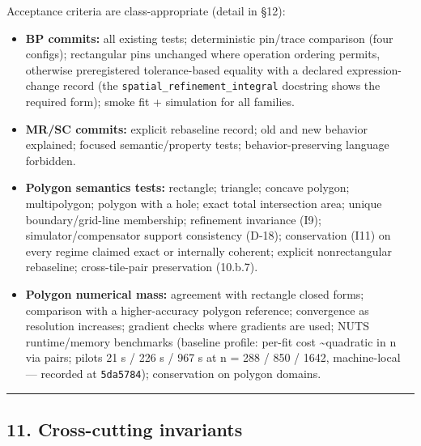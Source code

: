 \documentclass[
  10pt,
]{article}
\providecommand{\tightlist}{%
  \setlength{\itemsep}{0pt}\setlength{\parskip}{0pt}}
\begin{document}
Acceptance criteria are class-appropriate (detail in §12):

\begin{itemize}
\tightlist
\item
  \textbf{BP commits:} all existing tests; deterministic pin/trace comparison (four configs); rectangular pins unchanged where operation ordering permits, otherwise preregistered tolerance-based equality with a declared expression-change record (the \texttt{spatial\_\allowbreak{}refinement\_\allowbreak{}integral} docstring shows the required form); smoke fit + simulation for all families.
\item
  \textbf{MR/SC commits:} explicit rebaseline record; old and new behavior explained; focused semantic/property tests; behavior-preserving language forbidden.
\item
  \textbf{Polygon semantics tests:} rectangle; triangle; concave polygon; multipolygon; polygon with a hole; exact total intersection area; unique boundary/grid-line membership; refinement invariance (I9); simulator/compensator support consistency (D-18); conservation (I11) on every regime claimed exact or internally coherent; explicit nonrectangular rebaseline; cross-tile-pair preservation (10.b.7).
\item
  \textbf{Polygon numerical mass:} agreement with rectangle closed forms; comparison with a higher-accuracy polygon reference; convergence as resolution increases; gradient checks where gradients are used; NUTS runtime/memory benchmarks (baseline profile: per-fit cost \textasciitilde quadratic in n via pairs; pilots 21 s / 226 s / 967 s at n = 288 / 850 / 1642, machine-local --- recorded at \texttt{5da5784}); conservation on polygon domains.
\end{itemize}

\begin{center}\rule{0.5\linewidth}{0.5pt}\end{center}

\hypertarget{cross-cutting-invariants}{%
\subsection{11. Cross-cutting invariants}\label{cross-cutting-invariants}}
\end{document}
